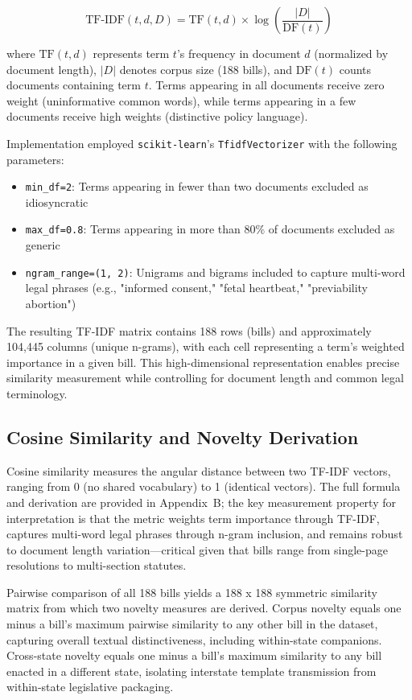 \begin{equation}
    \text{TF-IDF}(t, d, D) = \text{TF} (t, d) \times
    \log\left(\frac{|D|}{\text{DF}(t)}\right)
\end{equation}

where $\text{TF}(t, d)$ represents term $t$'s frequency in document $d$ (normalized by document length), $|D|$ denotes corpus size (188 bills), and $\text{DF}(t)$ counts documents containing term $t$. Terms appearing in all documents receive zero weight (uninformative common words), while terms appearing in a few documents receive high weights (distinctive policy language).

Implementation employed \texttt{scikit-learn}'s
\texttt{TfidfVectorizer} with the following parameters:
\begin{itemize}
    \item \texttt{min\_df=2}: Terms appearing in fewer than two documents excluded as idiosyncratic
    \item \texttt{max\_df=0.8}: Terms appearing in more than 80\% of documents excluded as generic
    \item \texttt{ngram\_range=(1, 2)}: Unigrams and bigrams included to capture multi-word legal phrases (e.g., "informed consent," "fetal heartbeat," "previability abortion")
\end{itemize}

The resulting TF-IDF matrix contains 188 rows (bills) and approximately 104,445 columns (unique n-grams), with each cell representing a term's weighted importance in a given bill. This high-dimensional representation enables precise similarity measurement while controlling for document length and common legal terminology.

\subsection{Cosine Similarity and Novelty Derivation}

Cosine similarity measures the angular distance between two TF-IDF vectors, ranging from 0 (no shared vocabulary) to 1 (identical vectors). The full formula and derivation are provided in Appendix~B; the key measurement property for interpretation is that the metric weights term importance through TF-IDF, captures multi-word legal phrases through n-gram inclusion, and remains robust to document length variation---critical given that bills range from single-page resolutions to multi-section statutes.

Pairwise comparison of all 188 bills yields a 188 x 188 symmetric similarity matrix from which two novelty measures are derived. Corpus novelty equals one minus a bill's maximum pairwise similarity to any other bill in the dataset, capturing overall textual distinctiveness, including within-state companions. Cross-state novelty equals one minus a bill's maximum similarity to any bill enacted in a different state, isolating interstate template transmission from within-state legislative packaging.

